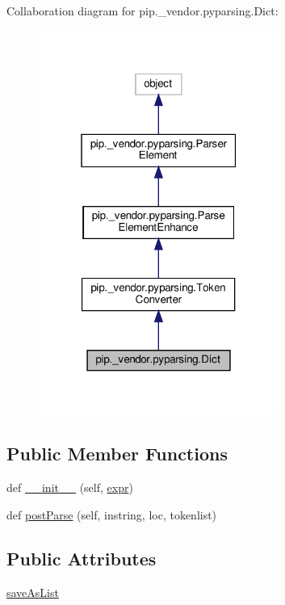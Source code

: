 Collaboration diagram for pip.\+\_\+vendor.\+pyparsing.\+Dict\+:
\nopagebreak
\begin{figure}[H]
\begin{center}
\leavevmode
\includegraphics[width=223pt]{classpip_1_1__vendor_1_1pyparsing_1_1Dict__coll__graph}
\end{center}
\end{figure}
\subsection*{Public Member Functions}
\begin{DoxyCompactItemize}
\item 
def \hyperlink{classpip_1_1__vendor_1_1pyparsing_1_1Dict_a2b75b1f00eed65e1e30c5f81096c5d1f}{\+\_\+\+\_\+init\+\_\+\+\_\+} (self, \hyperlink{classpip_1_1__vendor_1_1pyparsing_1_1ParseElementEnhance_af574b49a0a7d914693fdaa833df7098f}{expr})
\item 
def \hyperlink{classpip_1_1__vendor_1_1pyparsing_1_1Dict_ad228ab01933bb6645e1076575e97a709}{post\+Parse} (self, instring, loc, tokenlist)
\end{DoxyCompactItemize}
\subsection*{Public Attributes}
\begin{DoxyCompactItemize}
\item 
\hyperlink{classpip_1_1__vendor_1_1pyparsing_1_1Dict_acf4c750d0bedbdd336da71e971e55331}{save\+As\+List}
\end{DoxyCompactItemize}
